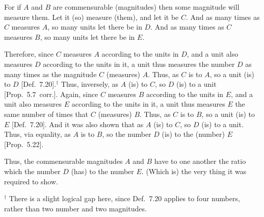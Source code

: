 \begin{Parallel}{}{}
{For if $A$ and $B$ are commensurable (magnitudes) then some magnitude
will measure them. Let it (so) measure (them), and let it be $C$. And
as many times as $C$ measures $A$, so many units let there be in
$D$. And as many times as $C$ measures $B$, so many units let there be
in $E$.

Therefore, since $C$ measures $A$ according to the units in $D$, and
a unit also measures $D$ according to the units in it,  a unit thus measures the
number $D$ as many times as the magnitude $C$ (measures) $A$. 
Thus, as $C$ is to $A$, so a unit (is) to $D$ [Def.~7.20].$^\dag$ Thus, inversely, as $A$ (is) to $C$, so
$D$ (is) to a unit [Prop.~5.7~corr.]. Again, since
$C$ measures $B$ according to the units in $E$, and a unit also measures $E$ according to the units in it,   a unit thus measures $E$ the
same number of times that $C$ (measures) $B$. Thus, as $C$ is to $B$, so
a unit (is) to $E$ [Def.~7.20]. And it was also
shown that as $A$ (is) to $C$, so $D$ (is) to a unit. Thus, via equality,
as $A$ is to $B$, so the number $D$ (is) to the (number) $E$ [Prop.~5.22].

Thus, the commensurable magnitudes $A$ and $B$ have to one another
the ratio which the number $D$ (has) to the number $E$. (Which is) the
very thing it was required to show.}
\end{Parallel}
{\footnotesize\noindent$^\dag$ There is a slight logical gap here, since Def.~7.20  applies to four numbers, rather than two number and two magnitudes.}

